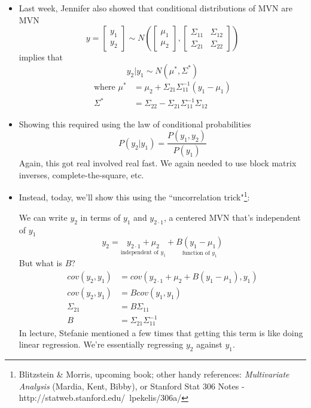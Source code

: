 \documentclass[12pt]{article}
\begin{document}
\begin{itemize}
	\item Last week, Jennifer also showed that conditional distributions of MVN are MVN
	\begin{equation*}
	y = \left[ \begin{array}{c} y_1 \\ y_2 \end{array} \right] \sim N \left(
	\left[ \begin{array}{c} \mu_1 \\ \mu_2 \end{array} \right],
	\left[
	\begin{array}{cc}
	\Sigma_{11} & \Sigma_{12} \\
	\Sigma_{21} & \Sigma_{22}
	\end{array}
	\right]
	\right)
	\end{equation*}
	implies that $$y_2 | y_1 \sim N(\mu^*, \Sigma^*)$$
	\begin{align*}
	\text{where \ \ } \mu^* &= \mu_2 + \Sigma_{21} \Sigma_{11}^{-1} (y_1 - \mu_1) \\
	 \Sigma^* &= \Sigma_{22} - \Sigma_{21} \Sigma_{11}^{-1} \Sigma_{12}
	\end{align*}	
	\item Showing this required using the law of conditional probabilities
	$$P(y_2 | y_1) = \frac{P(y_1, y_2)}{P(y_1)}$$
	Again, this got real involved real fast. We again needed to use block matrix inverses, complete-the-square, etc.
	\item Instead, today, we'll show this using the ``uncorrelation trick"\footnote{Blitzstein \& Morris, upcoming book; other handy references: \textit{Multivariate Analysis} (Mardia, Kent, Bibby), or Stanford Stat 306 Notes - http://statweb.stanford.edu/~lpekelis/306a/}:
	
	We can write $y_2$ in terms of $y_1$ and $y_{2 \cdot 1}$, a centered MVN that's independent of $y_1$
	\begin{equation*}
	y_2 =  \underset{\text{independent of }y_1}{y_{2 \cdot 1} + \mu_2} + \underset{\text{function of }y_1}{B(y_1 - \mu_1)}
	\end{equation*}
	But what is $B$?
	\begin{align*}
		cov(y_2,y_1) &= cov(y_{2 \cdot 1} + \mu_2 + B(y_1 - \mu_1), y_1) \\
		cov(y_2,y_1) &= B cov(y_1, y_1) \\
		\Sigma_{21} &= B \Sigma_{11} \\
		B &= \Sigma_{21} \Sigma_{11}^{-1} 
	\end{align*}
	In lecture, Stefanie mentioned a few times that getting this term is like doing linear regression. We're essentially regressing $y_2$ against $y_1$.
	

\end{itemize}
\end{document}
